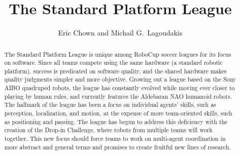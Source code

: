 \documentclass{llncs}
\begin{document}
\title{The Standard Platform League}




\author{ Eric Chown and Michail G.~Lagoudakis}





\maketitle

\begin{abstract}
The Standard Platform League is unique among RoboCup soccer leagues for
its focus on software. Since all teams compete using the same hardware (a standard robotic platform),
success is predicated on software quality, and the shared hardware
makes quality judgments simpler and more objective. Growing out a league
based on the Sony AIBO quadruped robots, the league has constantly evolved while moving ever
closer to playing by human rules, and currently features the Aldebaran NAO humanoid robots. The hallmark of the league has been
a focus on individual agents' skills, such as perception, localization, and motion, at the expense
of more team-oriented skills, such as positioning and passing. The league has begun to address this deficiency
with the creation of the Drop-in Challenge, where robots
from multiple teams will work together. This new focus should force teams to work
on multi-agent coordination in more abstract and general terms and promises
to create fruitful new lines of research.
\end{abstract}
\end{document}
